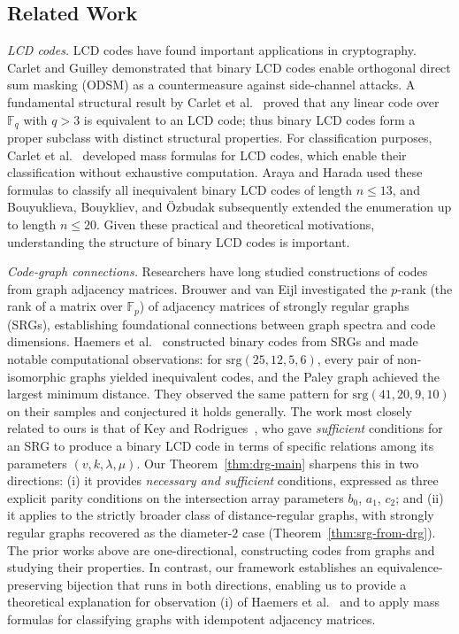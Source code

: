 \documentclass[a4paper,11pt]{article}
\theoremstyle{remark}
\newcommand{\FF}{\mathbb{F}}
\begin{document}
\subsection{Related Work}
\emph{LCD codes.} LCD codes have found important applications in cryptography. Carlet and Guilley \cite{carlet2014complementary} demonstrated that binary LCD codes enable orthogonal direct sum masking (ODSM) as a countermeasure against side-channel attacks. A fundamental structural result by Carlet et al.~\cite{carlet2018} proved that any linear code over $\FF_q$ with $q > 3$ is equivalent to an LCD code; thus binary LCD codes form a proper subclass with distinct structural properties.
For classification purposes, Carlet et al.~\cite{carlet2019} developed mass formulas for LCD codes, which enable their classification without exhaustive computation. Araya and Harada \cite{araya2019} used these formulas to classify all inequivalent binary LCD codes of length $n \leq 13$, and Bouyuklieva, Bouykliev, and \"Ozbudak \cite{bouyuklieva2026} subsequently extended the enumeration up to length $n \leq 20$.
Given these practical and theoretical motivations, understanding the structure of binary LCD codes is important.

\emph{Code-graph connections.} Researchers have long studied constructions of codes from graph adjacency matrices. Brouwer and van Eijl \cite{brouwer1992} investigated the $p$-rank (the rank of a matrix over $\FF_p$) of adjacency matrices of strongly regular graphs (SRGs), establishing foundational connections between graph spectra and code dimensions. Haemers et al.\ \cite{haemers1999} constructed binary codes from SRGs and made notable computational observations: for $\text{srg}(25,12,5,6)$, every pair of non-isomorphic graphs yielded inequivalent codes, and the Paley graph achieved the largest minimum distance. They observed the same pattern for $\text{srg}(41,20,9,10)$ on their samples and conjectured it holds generally.
The work most closely related to ours is that of Key and Rodrigues~\cite{key2018}, who gave \emph{sufficient} conditions for an SRG to produce a binary LCD code in terms of specific relations among its parameters $(v,k,\lambda,\mu)$. Our Theorem~\ref{thm:drg-main} sharpens this in two directions: (i) it provides \emph{necessary and sufficient} conditions, expressed as three explicit parity conditions on the intersection array parameters $b_0$, $a_1$, $c_2$; and (ii) it applies to the strictly broader class of distance-regular graphs, with strongly regular graphs recovered as the diameter-$2$ case (Theorem~\ref{thm:srg-from-drg}).
The prior works above are one-directional, constructing codes from graphs and studying their properties. In contrast, our framework establishes an equivalence-preserving bijection that runs in both directions, enabling us to provide a theoretical explanation for observation (i) of Haemers et al.\ \cite{haemers1999} and to apply mass formulas \cite{carlet2019} for classifying graphs with idempotent adjacency matrices.
\end{document}
